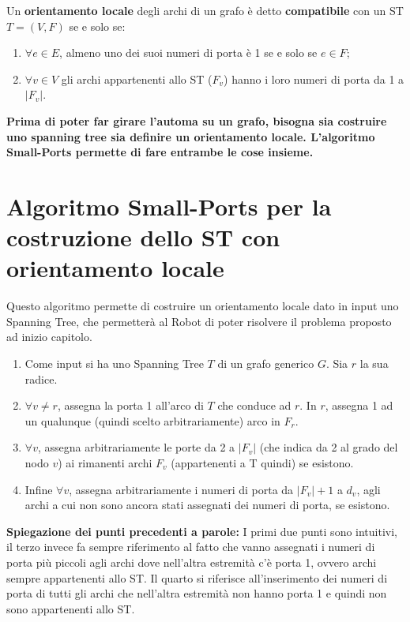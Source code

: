 \begin{definition}\label{def:st-locorient}
    Un \textbf{orientamento locale} degli archi di un grafo è detto
    \textbf{compatibile} con un ST $T=(V,F)$ se e solo se:
    \begin{enumerate}
        \item $\forall e \in E$, almeno uno dei suoi numeri di porta è 1 se e solo
              se $e \in F$;
        \item $\forall v \in V$ gli archi appartenenti allo ST ($F_v$) hanno i loro
              numeri di porta da 1 a $|F_v|$.
    \end{enumerate}
\end{definition}

\textbf{Prima di poter far girare l'automa su un grafo,
    bisogna sia costruire uno spanning tree sia definire un orientamento locale.
    L'algoritmo Small-Ports permette di fare entrambe le cose insieme.}

\section{Algoritmo Small-Ports per la costruzione dello ST con orientamento locale}
Questo algoritmo permette di costruire un orientamento locale dato in input uno
Spanning Tree, che permetterà al Robot di poter risolvere il problema proposto
ad inizio capitolo.
\begin{enumerate}
    \item Come input si ha uno Spanning Tree $T$ di un grafo generico $G$. Sia $r$
          la sua radice.

    \item $\forall v \neq r$, assegna la porta 1 all'arco di $T$ che conduce ad
          $r$. In $r$, assegna 1 ad un qualunque (quindi scelto arbitrariamente) arco in
          $F_r$.
    \item $\forall v$, assegna arbitrariamente le porte da 2 a $|F_v|$ (che indica
          da 2 al grado del nodo $v$) ai rimanenti archi $F_v$ (appartenenti a T quindi)
          se esistono.
    \item Infine $\forall v$, assegna arbitrariamente i numeri di porta da
          $|F_v|+1$ a $d_v$, agli archi a cui non sono ancora stati assegnati dei numeri
          di porta, se esistono.
\end{enumerate}

\textbf{Spiegazione dei punti precedenti a parole:} I primi due punti sono
intuitivi, il terzo invece fa sempre riferimento al fatto che vanno assegnati i
numeri di porta più piccoli agli archi dove nell'altra estremità c'è porta 1,
ovvero archi sempre appartenenti allo ST. Il quarto si riferisce all'inserimento
dei numeri di porta di tutti gli archi che nell'altra estremità non hanno porta
1 e quindi non sono appartenenti allo ST.

